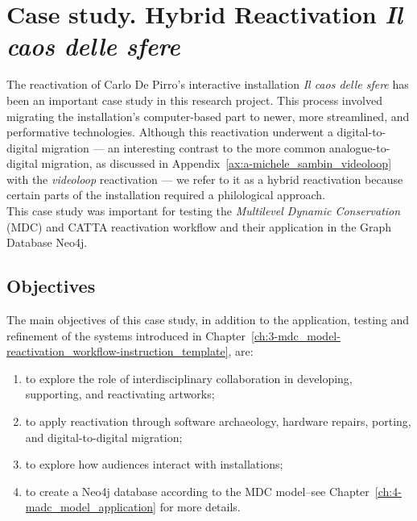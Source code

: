 \chapter{\label{ax:b-hybrid_reactivation_il_caos_delle_sfere}Case study. Hybrid Reactivation \textit{Il caos delle sfere}}

The reactivation of Carlo De Pirro’s interactive installation \textit{Il caos delle sfere} has been an important case study in this research project. This process involved migrating the installation’s computer-based part to newer, more streamlined, and performative technologies. Although this reactivation underwent a digital-to-digital migration — an interesting contrast to the more common analogue-to-digital migration, as discussed in Appendix~\ref{ax:a-michele_sambin_videoloop} with the \textit{videoloop} reactivation — we refer to it as a hybrid reactivation because certain parts of the installation required a philological approach.\\
This case study was important for testing the \textit{Multilevel Dynamic Conservation} (MDC) and CATTA reactivation workflow and their application in the Graph Database Neo4j.

\section{Objectives}
The main objectives of this case study, in addition to the application, testing and refinement of the systems introduced in Chapter~\ref{ch:3-mdc_model-reactivation_workflow-instruction_template}, are:
\begin{enumerate}
    \item to explore the role of interdisciplinary collaboration in developing, supporting, and reactivating artworks;
    \item to apply reactivation through software archaeology, hardware repairs, porting, and digital-to-digital migration;
    \item to explore how audiences interact with installations;
    \item to create a Neo4j database according to the MDC model–see Chapter~\ref{ch:4-madc_model_application} for more details.
\end{enumerate}

